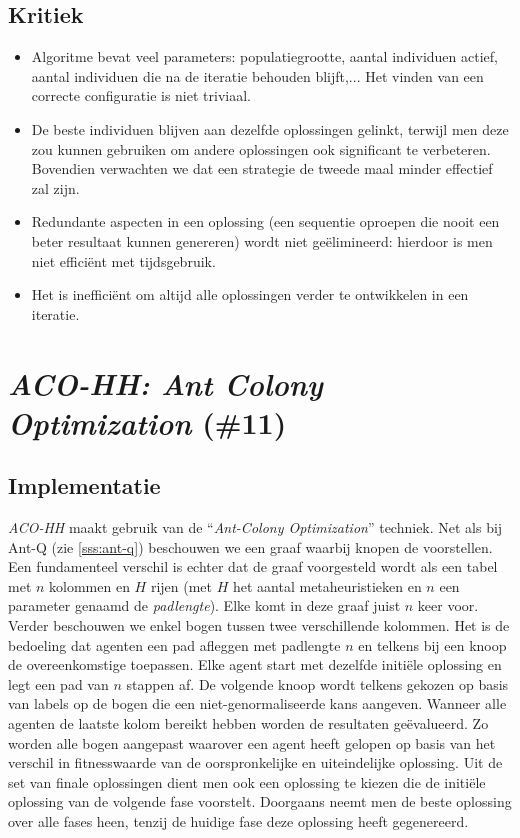 \subsection{Kritiek}
\begin{itemize}
 \item Algoritme bevat veel parameters: populatiegrootte, aantal individuen actief, aantal individuen die na de iteratie behouden blijft,... Het vinden van een correcte configuratie is niet triviaal.
 \item De beste individuen blijven aan dezelfde oplossingen gelinkt, terwijl men deze zou kunnen gebruiken om andere oplossingen ook significant te verbeteren. Bovendien verwachten we dat een strategie de tweede maal minder effectief zal zijn.
 \item Redundante aspecten in een oplossing (een sequentie oproepen die nooit een beter resultaat kunnen genereren) wordt niet ge\"elimineerd: hierdoor is men niet effici\"ent met tijdsgebruik.
 \item Het is ineffici\"ent om altijd alle oplossingen verder te ontwikkelen in een iteratie.
\end{itemize}
\section{\emph{ACO-HH: Ant Colony Optimization} (\#11)}
\label{sss:aco-hh}
\subsection{Implementatie}
\emph{ACO-HH}\cite{chesc-aco-hh} maakt gebruik van de ``\emph{Ant-Colony Optimization}''\cite{hom/aco} techniek. Net als bij Ant-Q (zie \ref{sss:ant-q}) beschouwen we een graaf waarbij knopen de \abllhn{} voorstellen. Een fundamenteel verschil is echter dat de graaf voorgesteld wordt als een tabel met $n$ kolommen en $H$ rijen (met $H$ het aantal metaheuristieken en $n$ een parameter genaamd de \emph{padlengte}). Elke \abllh{} komt in deze graaf juist $n$ keer voor. Verder beschouwen we enkel bogen tussen twee verschillende kolommen. Het is de bedoeling dat agenten een pad afleggen met padlengte $n$ en telkens bij een knoop de overeenkomstige \abllh{} toepassen. Elke agent start met dezelfde initi\"ele oplossing en legt een pad van $n$ stappen af. De volgende knoop wordt telkens gekozen op basis van labels op de bogen die een niet-genormaliseerde kans aangeven. Wanneer alle agenten de laatste kolom bereikt hebben worden de resultaten ge\"evalueerd. Zo worden alle bogen aangepast waarover een agent heeft gelopen op basis van het verschil in fitnesswaarde van de oorspronkelijke en uiteindelijke oplossing. Uit de set van finale oplossingen dient men ook een oplossing te kiezen die de initi\"ele oplossing van de volgende fase voorstelt. Doorgaans neemt men de beste oplossing over alle fases heen, tenzij de huidige fase deze oplossing heeft gegenereerd.
